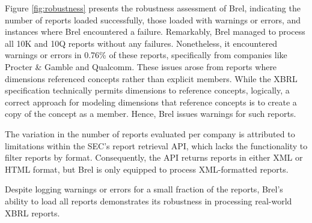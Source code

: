 

Figure \ref{fig:robustness} presents the robustness assessment of Brel, 
indicating the number of reports loaded successfully, those loaded with warnings or errors, 
and instances where Brel encountered a failure. 
Remarkably, Brel managed to process all 10K and 10Q reports without any failures. 
Nonetheless, it encountered warnings or errors in 0.76\% of these reports, 
specifically from companies like Procter \& Gamble and Qualcomm. 
These issues arose from reports where dimensions referenced concepts rather than explicit members. 
While the XBRL specification technically permits dimensions to reference concepts, logically, 
a correct approach for modeling dimensions that reference concepts is to create a copy of the concept as a member. 
Hence, Brel issues warnings for such reports.

The variation in the number of reports evaluated per company is attributed to limitations within the SEC's report retrieval API, 
which lacks the functionality to filter reports by format. 
Consequently, the API returns reports in either XML or HTML format, but Brel is only equipped to process XML-formatted reports.

Despite logging warnings or errors for a small fraction of the reports, 
Brel's ability to load all reports demonstrates its robustness in processing real-world XBRL reports.

